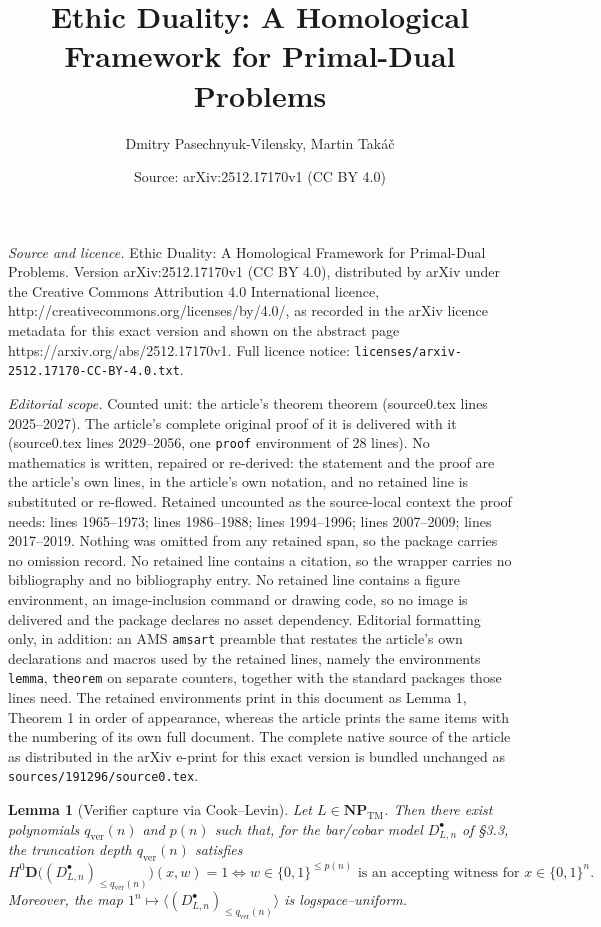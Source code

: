 \documentclass[10pt,a4paper]{amsart}
\title{Ethic Duality: A Homological Framework for Primal-Dual Problems}
\author{Dmitry Pasechnyuk-Vilensky, Martin Tak\'a\v{c}}
\date{Source: arXiv:2512.17170v1 (CC BY 4.0)}
\newtheorem{lemma}{Lemma}
\begin{document}
\maketitle

\noindent\emph{Source and licence.} Ethic Duality: A Homological Framework for Primal-Dual Problems. Version arXiv:2512.17170v1 (CC BY 4.0), distributed by arXiv under the Creative Commons Attribution 4.0 International licence, http://creativecommons.org/licenses/by/4.0/, as recorded in the arXiv licence metadata for this exact version and shown on the abstract page https://arxiv.org/abs/2512.17170v1. Full licence notice: \texttt{licenses/arxiv-2512.17170-CC-BY-4.0.txt}.\par\smallskip

\noindent\textit{Editorial scope.} Counted unit: the article's theorem theorem (source0.tex lines 2025--2027). The article's complete original proof of it is delivered with it (source0.tex lines 2029--2056, one \texttt{proof} environment of 28 lines). No mathematics is written, repaired or re-derived: the statement and the proof are the article's own lines, in the article's own notation, and no retained line is substituted or re-flowed.  Retained uncounted as the source-local context the proof needs: lines 1965--1973; lines 1986--1988; lines 1994--1996; lines 2007--2009; lines 2017--2019.  Nothing was omitted from any retained span, so the package carries no omission record.  No retained line contains a citation, so the wrapper carries no bibliography and no bibliography entry.  No retained line contains a figure environment, an image-inclusion command or drawing code, so no image is delivered and the package declares no asset dependency.  Editorial formatting only, in addition: an AMS \texttt{amsart} preamble that restates the article's own declarations and macros used by the retained lines, namely the environments \texttt{lemma}, \texttt{theorem} on separate counters, together with the standard packages those lines need.  The retained environments print in this document as Lemma 1, Theorem 1 in order of appearance, whereas the article prints the same items with the numbering of its own full document.  The complete native source of the article as distributed in the arXiv e-print for this exact version is bundled unchanged as \texttt{sources/191296/source0.tex}.
\begin{lemma}[Verifier capture via Cook--Levin]\label{lem:verifier-capture}
Let $L\in \mathbf{NP}_{\mathrm{TM}}$. Then there exist polynomials $q_{\mathrm{ver}}(n)$ and $p(n)$ such that, for the bar/cobar model $D_{L,n}^{\bullet}$ of §3.3, the truncation depth $q_{\mathrm{ver}}(n)$ satisfies
\[
H^{0}\mathbf D\!\big((D_{L,n}^{\bullet})_{\le q_{\mathrm{ver}}(n)}\big)(x,w)=1
\iff
\text{$w\in\{0,1\}^{\le p(n)}$ is an accepting witness for $x\in\{0,1\}^n$}.
\]
Moreover, the map $1^n\mapsto \langle (D_{L,n}^{\bullet})_{\le q_{\mathrm{ver}}(n)}\rangle$ is logspace–uniform.
\end{lemma}
\end{document}
